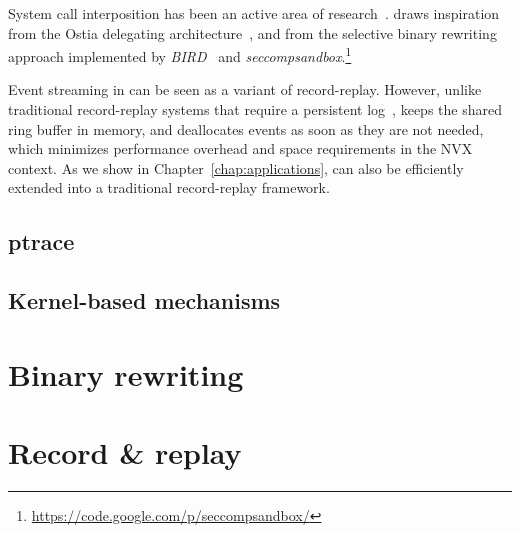 System call interposition has been an active area of
research~\cite{jain1999,provos2002,janus}.  \nx
draws inspiration from the Ostia delegating architecture~\cite{ostia},
and from the selective binary rewriting approach implemented by
\emph{BIRD}~\cite{bird} and
\emph{seccompsandbox}.\footnote{\url{https://code.google.com/p/seccompsandbox/}}

Event streaming in \nx can be seen as a variant of
record-replay. However, unlike traditional record-replay
systems that require a persistent log~\cite{scribe,jockey,geels06,r2},
\nx keeps the shared ring buffer in memory, and deallocates events as
soon as they are not needed, which minimizes performance overhead and
space requirements in the NVX context. As we show in
Chapter~\ref{chap:applications}, \nx can also be efficiently extended into a
traditional record-replay framework.

\subsection{ptrace}

\subsection{Kernel-based mechanisms}

\section{Binary rewriting}

\section{Record \& replay}
